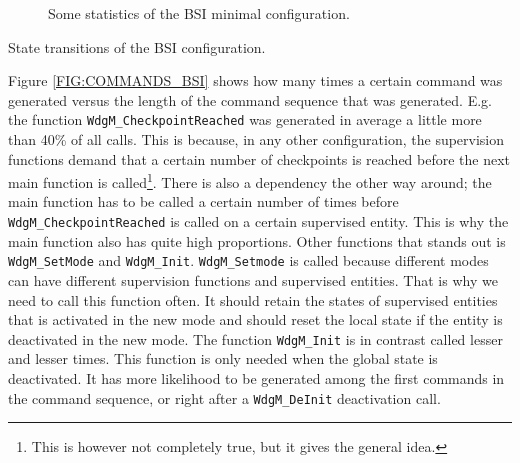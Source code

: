 \begin{figure}[!ht]
  \caption{Some statistics of the BSI minimal configuration.}
  \label{FIG:BSI}
\end{figure}

\begin{table}[!ht]
  \caption{State transitions of the BSI configuration.}
  \label{TABLE:STATUSES_BSI}
  
\end{table}

Figure \ref{FIG:COMMANDS_BSI} shows how many times a certain command
was generated versus the length of the command sequence that was
generated. E.g. the function \lstinline!WdgM_CheckpointReached! was
generated in average a little more than 40\% of all calls. This is
because, in any other configuration, the supervision functions demand
that a certain number of checkpoints is reached before the next main
function is called\footnote{This is however not completely true, but
it gives the general idea.}. There is also a dependency the other way
around; the main function has to be called a certain number of times
before \lstinline!WdgM_CheckpointReached! is called on a certain
supervised entity. This is why the main function also has quite high
proportions. Other functions that stands out is
\lstinline!WdgM_SetMode! and \lstinline!WdgM_Init!.
\lstinline!WdgM_Setmode! is called because different modes can have
different supervision functions and supervised entities. That is why
we need to call this function often. It should retain the states of
supervised entities that is activated in the new mode and should reset
the local state if the entity is deactivated in the new mode. The
function \lstinline!WdgM_Init! is in contrast called lesser and lesser
times. This function is only needed when the global state is
deactivated. It has more likelihood to be generated among the first
commands in the command sequence, or right after a
\lstinline!WdgM_DeInit! deactivation call.


